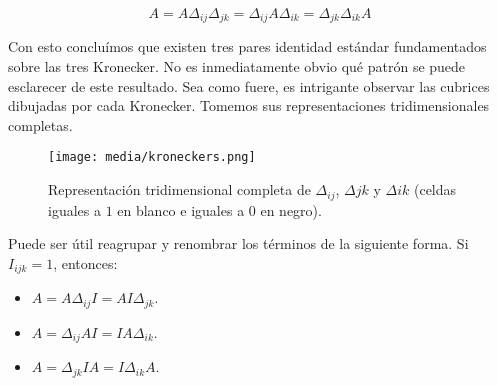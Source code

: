 $$A = A \Delta_{ij} \Delta_{jk} = \Delta_{ij} A \Delta_{ik} = \Delta_{jk} \Delta_{ik} A$$

Con esto concluímos que existen tres pares identidad estándar fundamentados sobre las tres Kronecker. No es inmediatamente obvio qué patrón se puede esclarecer de este resultado. Sea como fuere, es intrigante observar las cubrices dibujadas por cada Kronecker. Tomemos sus representaciones tridimensionales completas.

\begin{figure}[H]
	\texttt{[image: media/kroneckers.png]}
	\caption{Representación tridimensional completa de $\Delta_{ij}$, $\Delta{jk}$ y $\Delta{ik}$ (celdas iguales a $1$ en blanco e iguales a $0$ en negro).}
\end{figure}

Puede ser útil reagrupar y renombrar los términos de la siguiente forma. Si $I_{ijk} = 1$, entonces:

\begin{itemize}
	\item $A = A \Delta_{ij} I = A I \Delta_{jk}$.
	\item $A = \Delta_{ij} A I = I A \Delta_{ik}$.
	\item $A = \Delta_{jk} I A = I \Delta_{ik} A$.
\end{itemize}
